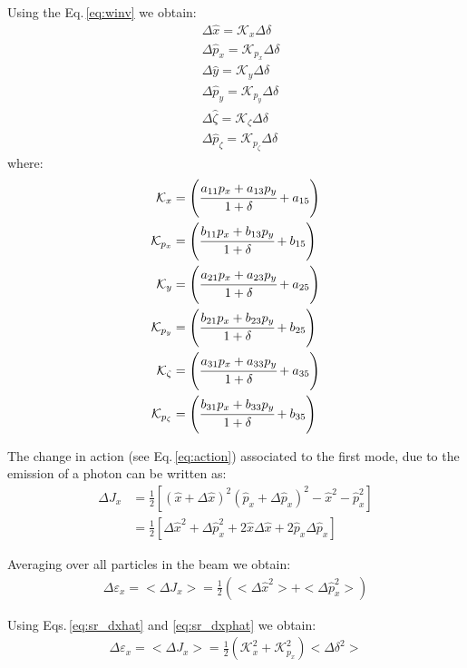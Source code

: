 Using the Eq.\,\ref{eq:winv} we obtain:
\begin{align}
&\Delta \hat{x} = \mathcal{K}_x \Delta \delta \label{eq:sr_dxhat}\\
&\Delta \hat{p}_x = \mathcal{K}_{p_x} \Delta \delta \label{eq:sr_dxphat}\\
&\Delta \hat{y} = \mathcal{K}_{y} \Delta \delta \\
&\Delta \hat{p}_y = \mathcal{K}_{p_y} \Delta \delta\\
&\Delta \hat{\zeta} = \mathcal{K}_{\zeta} \Delta \delta \\
&\Delta \hat{p}_\zeta = \mathcal{K}_{p_{\zeta}}\Delta \delta
\end{align}
where:
\begin{align}
\mathcal{K}_x &= 
\left( \cfrac{a_{11}p_{x} + a_{13}p_{y} }{1 + \delta} + a_{15}\right)\\
\mathcal{K}_{p_x} &= 
\left( \cfrac{b_{11}p_{x} + b_{13}p_{y} }{1 + \delta} + b_{15}\right)\\
\mathcal{K}_y &= 
\left( \cfrac{a_{21}p_{x} + a_{23}p_{y} }{1 + \delta} + a_{25}\right)\\
\mathcal{K}_{{p}_y} &= 
\left( \cfrac{b_{21}p_{x} + b_{23}p_{y} }{1 + \delta} + b_{25}\right)\\
\mathcal{K}_{\zeta} &= 
\left( \cfrac{a_{31}p_{x} + a_{33}p_{y} }{1 + \delta} + a_{35}\right)\\
\mathcal{K}_{p_\zeta} &= 
\left( \cfrac{b_{31}p_{x} + b_{33}p_{y} }{1 + \delta} + b_{35}\right)
\end{align}

The change in action (see Eq.\,\ref{eq:action}) associated to the first mode, due to the emission of a photon can be written as:
\begin{align}
\Delta J_x &= \frac{1}{2}\left[
\left(\hat{x} +\Delta \hat{x}\right)^2 
\left(\hat{p}_x +\Delta \hat{p}_x \right)^2 
-\hat{x}^2 - \hat{p}_x^2
\right]\\
&= \frac{1}{2}\left[
\Delta \hat{x}^2 + \Delta \hat{p}_{x}^2
+ 2 \hat{x} \Delta \hat{x} + 2 \hat{p}_{x} \Delta \hat{p}_{x} 
\right]
\end{align}

Averaging over all particles in the beam we obtain:
\begin{align}
\Delta \varepsilon_x = <\Delta J_x> = 
\frac{1}{2}\left( <\Delta \hat{x}^2> + <\Delta \hat{p}_{x}^2> \right)
\end{align}

Using Eqs.\,\ref{eq:sr_dxhat} and \ref{eq:sr_dxphat} we obtain:
\begin{align}
\Delta \varepsilon_x = <\Delta J_x> = 
\frac{1}{2}\left(\mathcal{K}^2_x + \mathcal{K}^2_{p_x}\right)<\Delta \delta^2>
\end{align}

